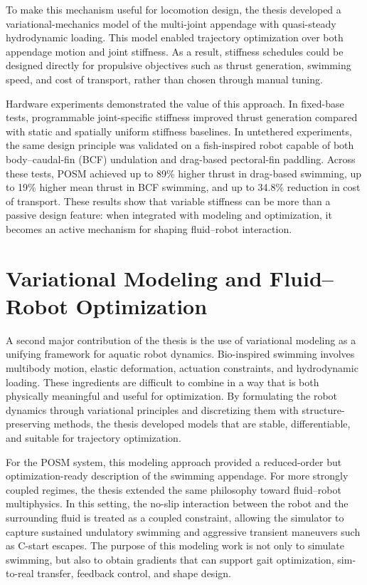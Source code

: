 To make this mechanism useful for locomotion design, the thesis developed a variational-mechanics model of the multi-joint appendage with quasi-steady hydrodynamic loading. This model enabled trajectory optimization over both appendage motion and joint stiffness. As a result, stiffness schedules could be designed directly for propulsive objectives such as thrust generation, swimming speed, and cost of transport, rather than chosen through manual tuning.

Hardware experiments demonstrated the value of this approach. In fixed-base tests, programmable joint-specific stiffness improved thrust generation compared with static and spatially uniform stiffness baselines. In untethered experiments, the same design principle was validated on a fish-inspired robot capable of both body--caudal-fin (BCF) undulation and drag-based pectoral-fin paddling. Across these tests, POSM achieved up to 89\% higher thrust in drag-based swimming, up to 19\% higher mean thrust in BCF swimming, and up to 34.8\% reduction in cost of transport. These results show that variable stiffness can be more than a passive design feature: when integrated with modeling and optimization, it becomes an active mechanism for shaping fluid--robot interaction.

\section{Variational Modeling and Fluid--Robot Optimization}

A second major contribution of the thesis is the use of variational modeling as a unifying framework for aquatic robot dynamics. Bio-inspired swimming involves multibody motion, elastic deformation, actuation constraints, and hydrodynamic loading. These ingredients are difficult to combine in a way that is both physically meaningful and useful for optimization. By formulating the robot dynamics through variational principles and discretizing them with structure-preserving methods, the thesis developed models that are stable, differentiable, and suitable for trajectory optimization.

For the POSM system, this modeling approach provided a reduced-order but optimization-ready description of the swimming appendage. For more strongly coupled regimes, the thesis extended the same philosophy toward fluid--robot multiphysics. In this setting, the no-slip interaction between the robot and the surrounding fluid is treated as a coupled constraint, allowing the simulator to capture sustained undulatory swimming and aggressive transient maneuvers such as C-start escapes. The purpose of this modeling work is not only to simulate swimming, but also to obtain gradients that can support gait optimization, sim-to-real transfer, feedback control, and shape design.

